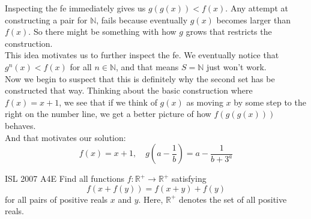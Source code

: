 \begin{solution}
    Inspecting the fe immediately gives us $g(g(x))<f(x)$.
    Any attempt at constructing a pair for $\mathbb{N}$, fails because
    eventually $g(x)$ becomes larger than $f(x)$. So there might be something
    with how $g$ grows that restricts the construction.\\

    This idea motivates us to further inspect the fe. We eventually notice
    that $g^n(x) < f(x)$ for all $n\in \mathbb{N}$, and that means $S =
    \mathbb{N}$ just won't work.\\

    Now we begin to suspect that this is definitely why the second set has be
    constructed that way. Thinking about the basic construction where $f(x) =
    x+1$, we see that if we think of $g(x)$ as moving $x$ by some step to the
    right on the number line, we get a better picture of how $f(g(g(x)))$
    behaves.\\

    And that motivates our solution:
    \[\boxed{f(x) = x+1,\quad g\left(a-\frac{1}{b}\right) = a - \frac{1}{b+3^a}}\] 
\end{solution}


{ISL 2007 A4}{E}{
    Find all functions $ f: \mathbb{R}^{ + }\to\mathbb{R}^{ + }$ satisfying 
    \[f\left(x + f\left(y\right)\right) = f\left(x + y\right) + f\left(y\right)\] 
    for all pairs of positive reals $ x$ and $ y$. Here, $ \mathbb{R}^{ + }$
    denotes the set of all positive reals.
}

